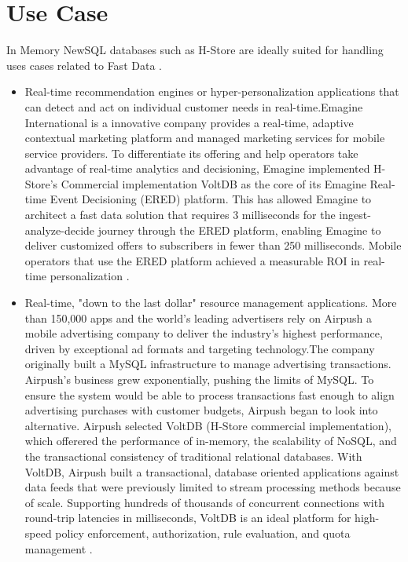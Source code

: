\documentclass[9pt,twocolumn,twoside]{../../styles/osajnl}
\begin{document}
\section{Use Case}
 
 In Memory NewSQL databases such as H-Store are ideally suited for handling uses cases related to Fast Data \cite{www-FastData}.
\begin{itemize}
\renewcommand{\labelitemi}{\scriptsize$\bullet$} 
\item Real-time recommendation engines or hyper-personalization applications 
that can detect and act on individual customer needs in real-time.Emagine International  is a innovative company provides a real-time, adaptive contextual marketing platform and managed marketing services for mobile service providers. 
To differentiate its offering and help operators take advantage of real-time analytics and
decisioning, Emagine implemented H-Store's Commercial implementation VoltDB as the core of its
Emagine Real-time Event Decisioning (ERED) platform. This has allowed Emagine to architect
a fast data solution that requires 3 milliseconds for the ingest-analyze-decide journey through
the ERED platform, enabling Emagine to deliver customized offers to subscribers in fewer than
250 milliseconds. Mobile operators that use the ERED platform achieved a measurable ROI
in real-time personalization \cite{www-Emagine}. 

\item Real-time, "down to the last dollar" resource management applications.
More than 150,000 apps and the world’s leading advertisers rely on Airpush a mobile advertising 
company 
to deliver the industry’s highest performance, driven by exceptional ad formats
and targeting technology.The company originally built a MySQL infrastructure
to manage advertising transactions. Airpush’s
business grew exponentially, pushing the limits of
MySQL. To ensure the system would be able to
process transactions fast enough to align advertising
purchases with customer budgets, Airpush began to
look into alternative. Airpush selected VoltDB (H-Store commercial implementation),
which offerered the performance
of in-memory, the scalability of NoSQL, and the
transactional consistency of traditional relational
databases.
With VoltDB, Airpush built a  transactional, database oriented
applications against data feeds that were
previously limited to stream processing methods
because of scale. Supporting hundreds of thousands of concurrent
connections with round-trip latencies in milliseconds,
VoltDB is an ideal platform for high-speed policy
enforcement, authorization, rule evaluation, and quota
management \cite{www-Airpush}.

\end{itemize}
\end{document}

